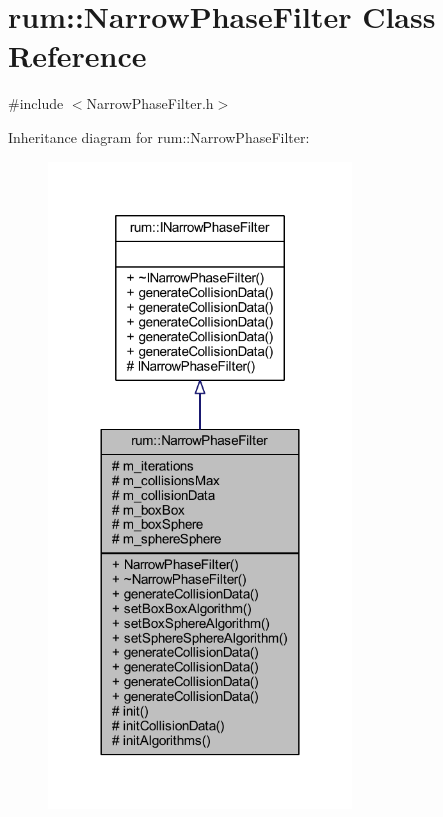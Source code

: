 \hypertarget{classrum_1_1_narrow_phase_filter}{}\section{rum\+:\+:Narrow\+Phase\+Filter Class Reference}
\label{classrum_1_1_narrow_phase_filter}


{\ttfamily \#include $<$Narrow\+Phase\+Filter.\+h$>$}



Inheritance diagram for rum\+:\+:Narrow\+Phase\+Filter\+:\nopagebreak
\begin{figure}[H]
\begin{center}
\leavevmode
\includegraphics[width=228pt]{classrum_1_1_narrow_phase_filter__inherit__graph}
\end{center}
\end{figure}


